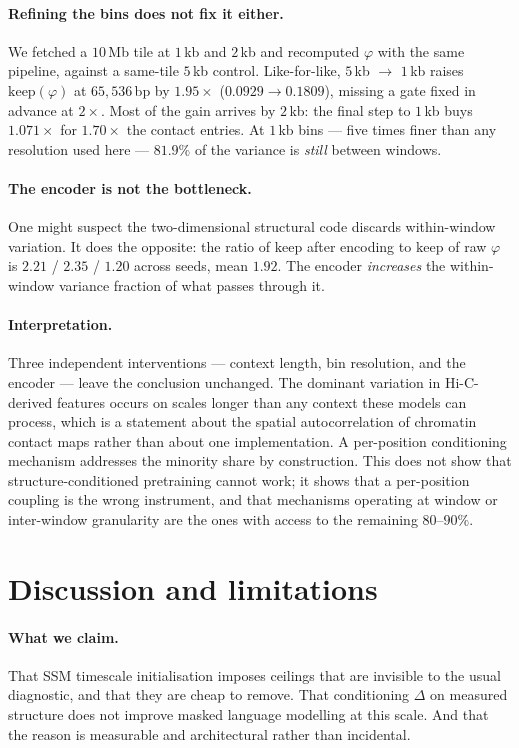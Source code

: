 \documentclass[10pt]{article}
\begin{document}
\paragraph{Refining the bins does not fix it either.}
We fetched a $10$\,Mb tile at $1$\,kb and $2$\,kb and recomputed $\varphi$ with
the same pipeline, against a same-tile $5$\,kb control. Like-for-like,
$5$\,kb $\to$ $1$\,kb raises $\mathrm{keep}(\varphi)$ at $65{,}536$\,bp by
$1.95\times$ ($0.0929 \to 0.1809$), missing a gate fixed in advance at
$2\times$. Most of the gain arrives by $2$\,kb: the final step to $1$\,kb buys
$1.071\times$ for $1.70\times$ the contact entries. At $1$\,kb bins ---
five times finer than any resolution used here --- $81.9\%$ of the variance is
\emph{still} between windows.

\paragraph{The encoder is not the bottleneck.}
One might suspect the two-dimensional structural code discards within-window
variation. It does the opposite: the ratio of $\mathrm{keep}$ after encoding to
$\mathrm{keep}$ of raw $\varphi$ is $2.21$ / $2.35$ / $1.20$ across seeds, mean
$1.92$. The encoder \emph{increases} the within-window variance fraction of what
passes through it.

\paragraph{Interpretation.}
Three independent interventions --- context length, bin resolution, and the
encoder --- leave the conclusion unchanged. The dominant variation in
Hi-C-derived features occurs on scales longer than any context these models can
process, which is a statement about the spatial autocorrelation of chromatin
contact maps rather than about one implementation. A per-position conditioning
mechanism addresses the minority share by construction. This does not show that
structure-conditioned pretraining cannot work; it shows that a per-position
coupling is the wrong instrument, and that mechanisms operating at window or
inter-window granularity are the ones with access to the remaining $80$--$90\%$.

\section{Discussion and limitations}

\paragraph{What we claim.} That SSM timescale initialisation imposes ceilings
that are invisible to the usual diagnostic, and that they are cheap to remove.
That conditioning $\Delta$ on measured structure does not improve masked
language modelling at this scale. And that the reason is measurable and
architectural rather than incidental.
\end{document}
